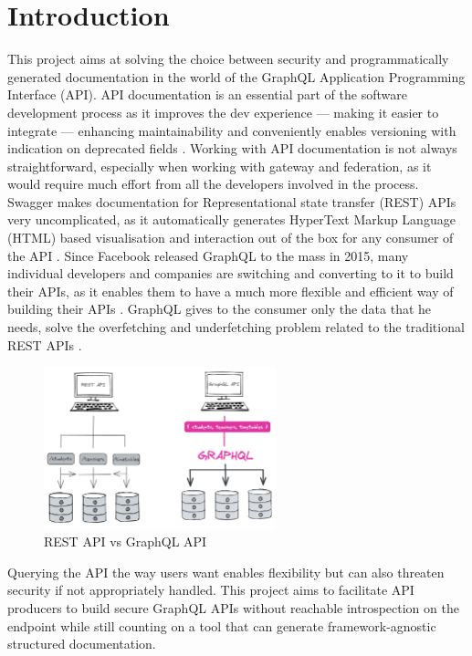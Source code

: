 \section*{Introduction}
\label{s:Introduction}
This project aims at solving the choice between security and programmatically
generated documentation in the world of the GraphQL Application Programming
Interface (API). API documentation is an essential part of the software
development process as it improves the dev experience --- making it easier to
integrate --- enhancing maintainability and conveniently enables versioning with
indication on deprecated fields \citep{fanWhyAPIDocumentation2021}. Working with
API documentation is not always straightforward, especially when working with
gateway and federation, as it would require much effort from all the developers
involved in the process. Swagger makes documentation for Representational state
transfer (REST) APIs very uncomplicated, as it automatically generates HyperText
Markup Language (HTML) based visualisation and interaction out of the box for
any consumer of the API \citep{korenExploitationOpenAPIDocumentation2018}. Since
Facebook released GraphQL to the mass in 2015, many individual developers and
companies are switching and converting to it to build their APIs, as it enables
them to have a much more flexible and efficient way of building their APIs
\citep{britoRESTVsGraphQL2020}. GraphQL gives to the consumer only the data that
he needs, solve the overfetching and underfetching problem related to the
traditional REST APIs \citep{witternGeneratingGraphQLWrappersREST2018}.
\begin{figure}[H]
  \centering
  \includegraphics[width=0.6\textwidth]{figures/restvsgraph}
  \caption{REST API vs GraphQL API}
  \label{f:restvsgraph}
\end{figure}
Querying the API the way users want enables flexibility but can also threaten
security if not appropriately handled. This project aims to facilitate API
producers to build secure GraphQL APIs without reachable introspection on the
endpoint while still counting on a tool that can generate framework-agnostic
structured documentation.

